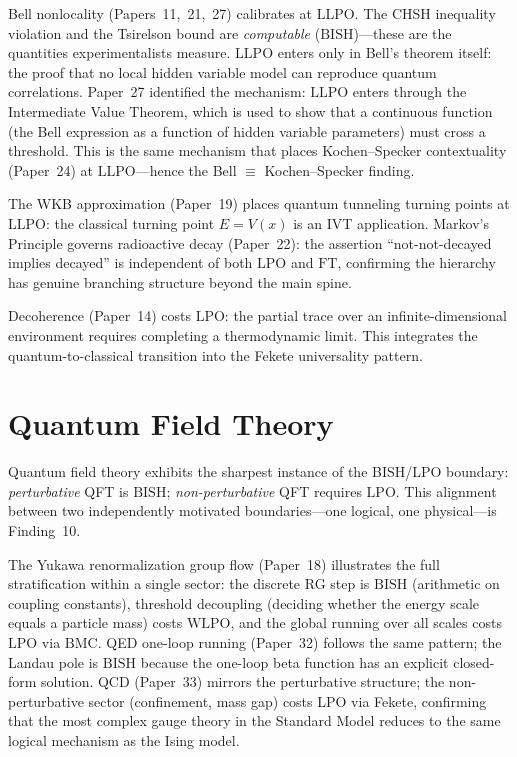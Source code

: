 \documentclass[11pt,a4paper]{report}
\theoremstyle{plain}
\theoremstyle{definition}
\theoremstyle{remark}
\newcommand{\BISH}{\mathrm{BISH}}
\newcommand{\LLPO}{\mathrm{LLPO}}
\newcommand{\WLPO}{\mathrm{WLPO}}
\newcommand{\LPO}{\mathrm{LPO}}
\newcommand{\BMC}{\mathrm{BMC}}
\newcommand{\FT}{\mathrm{FT}}
\begin{document}
Bell nonlocality (Papers~11,~21,~27) calibrates at $\LLPO$.  The CHSH inequality violation and the Tsirelson bound are \emph{computable} ($\BISH$)---these are the quantities experimentalists measure.  $\LLPO$ enters only in Bell's theorem itself: the proof that no local hidden variable model can reproduce quantum correlations.  Paper~27 identified the mechanism: $\LLPO$ enters through the Intermediate Value Theorem, which is used to show that a continuous function (the Bell expression as a function of hidden variable parameters) must cross a threshold.  This is the same mechanism that places Kochen--Specker contextuality (Paper~24) at $\LLPO$---hence the Bell $\equiv$ Kochen--Specker finding.

The WKB approximation (Paper~19) places quantum tunneling turning points at $\LLPO$: the classical turning point $E = V(x)$ is an IVT application.  Markov's Principle governs radioactive decay (Paper~22): the assertion ``not-not-decayed implies decayed'' is independent of both $\LPO$ and $\FT$, confirming the hierarchy has genuine branching structure beyond the main spine.

Decoherence (Paper~14) costs $\LPO$: the partial trace over an infinite-dimensional environment requires completing a thermodynamic limit.  This integrates the quantum-to-classical transition into the Fekete universality pattern.

\section{Quantum Field Theory}

Quantum field theory exhibits the sharpest instance of the BISH/LPO boundary: \emph{perturbative} QFT is $\BISH$; \emph{non-perturbative} QFT requires $\LPO$.  This alignment between two independently motivated boundaries---one logical, one physical---is Finding~10.

The Yukawa renormalization group flow (Paper~18) illustrates the full stratification within a single sector: the discrete RG step is $\BISH$ (arithmetic on coupling constants), threshold decoupling (deciding whether the energy scale equals a particle mass) costs $\WLPO$, and the global running over all scales costs $\LPO$ via $\BMC$.  QED one-loop running (Paper~32) follows the same pattern; the Landau pole is $\BISH$ because the one-loop beta function has an explicit closed-form solution.  QCD (Paper~33) mirrors the perturbative structure; the non-perturbative sector (confinement, mass gap) costs $\LPO$ via Fekete, confirming that the most complex gauge theory in the Standard Model reduces to the same logical mechanism as the Ising model.
\end{document}
